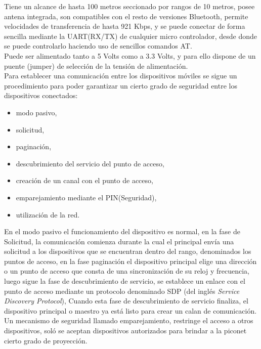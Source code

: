 Tiene un alcance de hasta 100 metros seccionado por rangos de 10 metros, posee antena integrada, son compatibles con el resto de versiones Bluetooth, permite velocidades de transferencia de hasta 921 Kbps, y se puede conectar de forma sencilla mediante la UART(RX/TX) de cualquier micro controlador, desde donde se puede controlarlo haciendo uso de sencillos comandos AT.\\

Puede ser alimentado tanto a 5 Volts como a 3.3 Volts, y para ello dispone de un puente (jumper) de selección de la tensión de alimentación.\\

Para establecer una comunicación entre los dispositivos móviles se sigue un procedimiento para poder garantizar un cierto grado de seguridad entre los dispositivos conectados:
\begin{itemize}
\item modo pasivo,
\item solicitud, 
\item paginación,
\item descubrimiento del servicio del punto de acceso,
\item creación de un canal con el punto de acceso,
\item emparejamiento mediante el PIN(Seguridad),
\item utilización de la red.
\end{itemize}

En el modo pasivo el funcionamiento del dispositivo es normal, en la fase de Solicitud, la comunicación comienza durante la cual el principal envía una solicitud a los dispositivos que se encuentran dentro del rango, denominados los puntos de acceso, en la fase paginación el dispositivo principal elige una dirección o un punto de acceso que consta de una sincronización de su reloj y frecuencia, luego sigue la fase de descubrimiento de servicio, se establece un enlace con el punto de acceso mediante un protocolo denominado SDP (del inglés \textit{Service Discovery Protocol}), Cuando esta fase de descubrimiento de servicio finaliza, el dispositivo principal o maestro ya está listo para crear un calan de comunicación.\\

Un mecanismo de seguridad llamado emparejamiento, restringe el acceso a otros dispositivos, soló se aceptan dispositivos autorizados para brindar a la piconet cierto grado de proyección.\\

